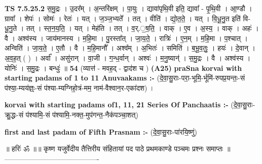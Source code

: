\documentclass[17pt]{extarticle}
\begin{document}
                  \newline
                                \textbf{ TS 7.5.25.2} \newline
                  स॒मु॒द्रः । उ॒दर᳚म् । अ॒न्तरि॑क्षम् । पा॒युः । द्यावा॑पृथि॒वी इति॒ द्यावा᳚ - पृ॒थि॒वी । आ॒ण्डौ । ग्रावा᳚ । शेपः॑ । सोमः॑ । रेतः॑ । यत् । ज॒ञ्ज॒भ्यते᳚ । तत् । वीति॑ । द्यो॒त॒ते॒ । यत् । वि॒धू॒नु॒त इति॑ वि-धू॒नु॒ते । तत् । स्त॒न॒य॒ति॒ । यत् । मेह॑ति । तत् । व॒र्.॒ष॒ति॒ । वाक् । ए॒व । अ॒स्य॒ । वाक् । अहः॑ । वै । अश्व॑स्य । जाय॑मानस्य । म॒हि॒मा । पु॒रस्ता᳚त् । जा॒य॒ते॒ । रात्रिः॑ । ए॒न॒म् । म॒हि॒मा । प॒श्चात् । अन्विति॑ । जा॒य॒ते॒ । ए॒तौ । वै । म॒हि॒मानौ᳚ । अश्व᳚म् । अ॒भितः॑ । समिति॑ । ब॒भू॒व॒तुः॒ । हयः॑ । दे॒वान् । अ॒व॒ह॒त् ( ) । अर्वा᳚ । असु॑रान् । वा॒जी । ग॒न्ध॒र्वान् । अश्वः॑ । म॒नु॒ष्यान्॑ । स॒मु॒द्रः । वै । अश्व॑स्य । योनिः॑ । स॒मु॒द्रः । बन्धुः॑ ॥ \textbf{  54} \newline
                  \newline
                      (व्यात्त॑ - मवह॒द् - द्वाद॑श च )  \textbf{(A25)} \newline \newline
\textbf{praSna korvai with starting padams of 1 to 11 Anuvaakams :-} \newline
(दे॒वा॒सु॒राः-परा॒-भूमि॒-र्भूमि॑-रुपप्र॒यन्तः॒-सं प॑श्या॒-म्यय॑ज्ञ्ः॒-सं प॑श्या-म्यग्निहो॒त्रं-मम॒ नाम॑-वैश्वान॒र-एका॑दश) । \newline

\textbf{korvai with starting padams of1, 11, 21 Series Of Panchaatis :-} \newline
(दे॒वा॒सु॒राः-क्रु॒द्धः-सं प॑श्यामि॒-सं प॑श्यामि॒-नक्त॒-मुप॑गन्त॒-नैक॑पञ्चा॒शत्) \newline

\textbf{first and last padam of Fifth Prasnam :-} \newline
(दे॒वा॒सु॒राः-पा॑रयि॒ष्णुं) \newline 


॥ हरिः॑ ॐ ॥॥ कृष्ण यजुर्वेदीय तैत्तिरीय संहितायां पद पाठे प्रथमकाण्डे पञ्चमः प्रश्नः समाप्तः ॥
---------------------------------------- \newline
\pagebreak
\pagebreak
        
\end{document}
